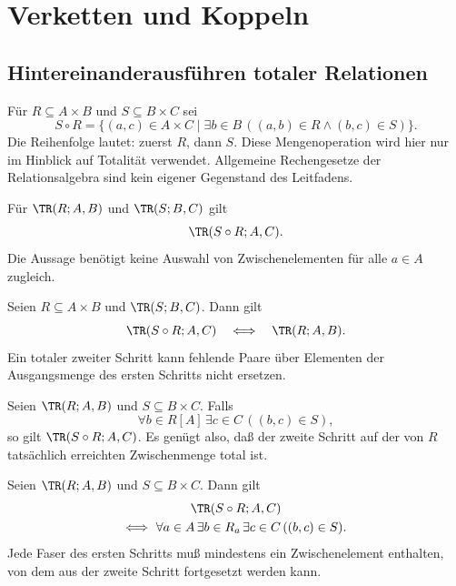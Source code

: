 \chapter{Verketten und Koppeln}
\label{b04guide:ch:combine}

\section{Hintereinanderausführen totaler Relationen}

\begin{definition}[Verkettung]
Für $R\subseteq A\times B$ und $S\subseteq B\times C$ sei
\[
 S\circ R
 =\{(a,c)\in A\times C\mid
       \exists b\in B\,((a,b)\in R\land(b,c)\in S)\}.
\]
Die Reihenfolge lautet: zuerst $R$, dann $S$.
Diese Mengenoperation wird hier nur im Hinblick auf Totalität
verwendet. Allgemeine Rechengesetze der Relationsalgebra
sind kein eigener Gegenstand des Leitfadens.
\end{definition}

\begin{theorem}
\label{b04guide:thm:composition}
Für $\TR(R;A,B)$ und $\TR(S;B,C)$ gilt
\[
 \TR(S\circ R;A,C).
\]
Die Aussage benötigt keine Auswahl von Zwischenelementen
für alle $a\in A$ zugleich.
\end{theorem}

\begin{theorem}
\label{b04guide:thm:compositiontest}
Seien $R\subseteq A\times B$ und $\TR(S;B,C)$. Dann gilt
\[
 \TR(S\circ R;A,C)\quad\Longleftrightarrow\quad\TR(R;A,B).
\]
Ein totaler zweiter Schritt kann fehlende Paare über
Elementen der Ausgangsmenge des ersten Schritts nicht ersetzen.
\end{theorem}

\begin{theorem}
\label{b04guide:thm:reachable}
Seien $\TR(R;A,B)$ und $S\subseteq B\times C$.
Falls
\[
 \forall b\in R[A]\,\exists c\in C\,((b,c)\in S),
\]
so gilt $\TR(S\circ R;A,C)$.
Es genügt also, daß der zweite Schritt auf der von $R$
tatsächlich erreichten Zwischenmenge total ist.
\end{theorem}

\begin{theorem}
\label{b04guide:thm:exactcomposition}
Seien $\TR(R;A,B)$ und $S\subseteq B\times C$. Dann gilt
\[
 \begin{gathered}
 \TR(S\circ R;A,C)\\
 \Longleftrightarrow\
 \forall a\in A\,\exists b\in R_a\,
                  \exists c\in C\,((b,c)\in S).
 \end{gathered}
\]
Jede Faser des ersten Schritts muß mindestens ein
Zwischenelement enthalten, von dem aus der zweite Schritt
fortgesetzt werden kann.
\end{theorem}

